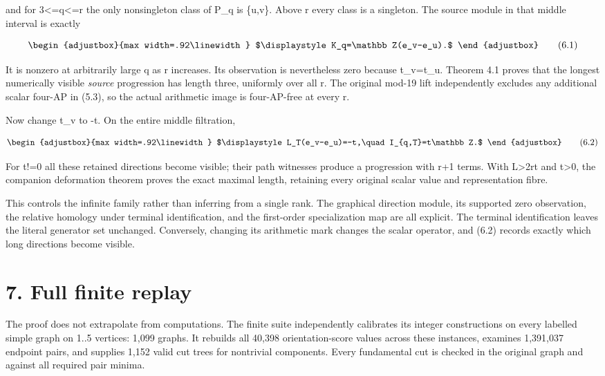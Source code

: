 and for 3\textless=q\textless=r the only nonsingleton class of P\_q is \{u,v\}. Above r every class is a singleton. The source module in that middle interval is exactly

\[
\begin{adjustbox}{max width=.92\linewidth}
$\displaystyle K_q=\mathbb Z(e_v-e_u).$
\end{adjustbox}
\tag{6.1}
\]

It is nonzero at arbitrarily large q as r increases. Its observation is nevertheless zero because t\_v=t\_u. Theorem 4.1 proves that the longest numerically visible \emph{source} progression has length three, uniformly over all r. The original mod-19 lift independently excludes any additional scalar four-AP in (5.3), so the actual arithmetic image is four-AP-free at every r.

Now change t\_v to -t. On the entire middle filtration,

\[
\begin{adjustbox}{max width=.92\linewidth}
$\displaystyle L_T(e_v-e_u)=-t,\quad I_{q,T}=t\mathbb Z.$
\end{adjustbox}
\tag{6.2}
\]

For t!=0 all these retained directions become visible; their path witnesses produce a progression with r+1 terms. With L\textgreater2r\textbar t\textbar{} and t\textgreater0, the companion deformation theorem proves the exact maximal length, retaining every original scalar value and representation fibre.

This controls the infinite family rather than inferring from a single rank. The graphical direction module, its supported zero observation, the relative homology under terminal identification, and the first-order specialization map are all explicit. The terminal identification leaves the literal generator set unchanged. Conversely, changing its arithmetic mark changes the scalar operator, and (6.2) records exactly which long directions become visible.

\section{7. Full finite replay}\label{n11-full-finite-replay}

The proof does not extrapolate from computations. The finite suite independently calibrates its integer constructions on every labelled simple graph on 1..5 vertices: 1,099 graphs. It rebuilds all 40,398 orientation-score values across these instances, examines 1,391,037 endpoint pairs, and supplies 1,152 valid cut trees for nontrivial components. Every fundamental cut is checked in the original graph and against all required pair minima.

